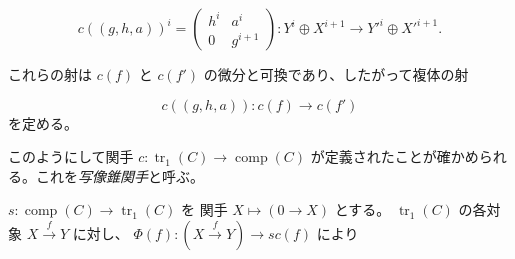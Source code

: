 \begin{equation}
  c((g,h,a))^i=
  \begin{pmatrix}
    h^i & a^i\\
    0 & g^{i+1}
  \end{pmatrix}
  \colon Y^i\oplus X^{i+1}\longrightarrow Y'^i\oplus X'^{i+1}.
  \tag{3.1.2.2}
\end{equation}

これらの射は $c(f)$ と $c(f')$ の微分と可換であり、したがって複体の射

\begin{equation}
  c((g,h,a))\colon c(f)\longrightarrow c(f')
  \tag{3.1.2.3}
\end{equation}
を定める。

このようにして関手
$c\colon\operatorname{tr}_1(C)\longrightarrow\operatorname{comp}(C)$
が定義されたことが確かめられる。これを\emph{写像錐関手}と呼ぶ。

$s\colon\operatorname{comp}(C)\longrightarrow\operatorname{tr}_1(C)$ を
関手 $X\longmapsto(0\longrightarrow X)$ とする。
$\operatorname{tr}_1(C)$ の各対象 $X\xrightarrow{f}Y$ に対し、
$\Phi(f)\colon(X\xrightarrow{f}Y)\longrightarrow s c(f)$ により
